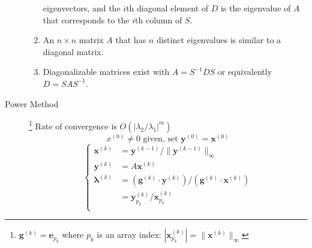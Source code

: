 \documentclass[8pt]{article}
\begin{document}
\begin{multicols}{2}
\begin{description}
\begin{enumerate}[i]
      eigenvectors, and the $i$th diagonal element of $D$ is the eigenvalue of $A$ that corresponds
      to the $i$th column of $S$.
    \item An $n\times n$ matrix $A$ that has $n$ distinct eigenvalues is similar to a diagonal
      matrix.
    \item Diagonalizable matrices exist with $A=S^{-1}DS$ or equivalently $D=SAS^{-1}$.
    \end{enumerate}
  \item[Power Method]
    \footnote{\label{ft:powmtd_g}$\mathbf{g}^{(k)} = \mathbf{e}_{p_k}$ where $p_k$ is an array
      index: $|\mathbf{x}^{(k)}_{p_k}| = \|\mathbf{x}^{(k)}\|_\infty$}
     Rate of convergence is  $O(|\lambda_2/\lambda_1|^{m})$
    $$x^{(0)} \neq 0\text{ given, set } \mathbf{y}^{(0)}=\mathbf{x}^{(0)}$$
    \begin{equation*}
      \left\{
    \begin{aligned}
        \mathbf{x}^{(k)} &= \mathbf{y}^{(k-1)}/\|\mathbf{y}^{(k-1)}\|_\infty \\
        \mathbf{y}^{(k)} &= A\mathbf{x}^{(k)} \\
        \boldsymbol{\lambda}^{(k)} &= (\mathbf{g}^{(k)} \cdot \mathbf{y}^{(k)})/(\mathbf{g}^{(k)} \cdot \mathbf{x}^{(k)}) \\
        &=\mathbf{y}^{(k)}_{p_k}/\mathbf{x}^{(k)}_{p_k} \\
      \end{aligned}
      \right.
    \end{equation*}


\end{description}
\end{multicols}
\end{document}
